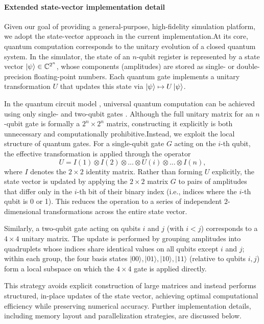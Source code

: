 \documentclass{article}
\begin{document}
\paragraph{Extended state-vector implementation detail}
Given our goal of providing a general-purpose, high-fidelity simulation platform, we adopt the state-vector approach in the current implementation.At its core, quantum computation corresponds to the unitary evolution of a closed quantum system. In the simulator, the state of an $n$-qubit register is represented by a state vector $\ket{\psi} \in \mathbb{C}^{2^n}$, whose components (amplitudes) are stored as single- or double-precision floating-point numbers. Each quantum gate implements a unitary transformation $U$ that updates this state via $\ket{\psi} \mapsto U\ket{\psi}$.

In the quantum circuit model , universal quantum computation can be achieved using only single- and two-qubit gates . Although the full unitary matrix for an $n$-qubit gate is formally a $2^n \times 2^n$ matrix, constructing it explicitly is both unnecessary and computationally prohibitive.Instead, we exploit the local structure of quantum gates. For a single-qubit gate $G$ acting on the $i$-th qubit, the effective transformation is applied through the operator  
$$
U = I(1) \otimes I(2) \otimes ... \otimes U(i) \otimes ... \otimes I(n),
$$  
where $I$ denotes the $2 \times 2$ identity matrix. Rather than forming $U$ explicitly, the state vector is updated by applying the $2 \times 2$ matrix $G$ to pairs of amplitudes that differ only in the $i$-th bit of their binary index (i.e., indices where the $i$-th qubit is 0 or 1). This reduces the operation to a series of independent $2$-dimensional transformations across the entire state vector.

Similarly, a two-qubit gate acting on qubits $i$ and $j$ (with $i < j$) corresponds to a $4 \times 4$ unitary matrix. The update is performed by grouping amplitudes into quadruplets whose indices share identical values on all qubits except $i$ and $j$; within each group, the four basis states $|00\rangle, |01\rangle, |10\rangle, |11\rangle$ (relative to qubits $i,j$) form a local subspace on which the $4 \times 4$ gate is applied directly.

This strategy avoids explicit construction of large matrices and instead performs structured, in-place updates of the state vector, achieving optimal computational efficiency while preserving numerical accuracy. Further implementation details, including memory layout and parallelization strategies, are discussed below.
\end{document}
